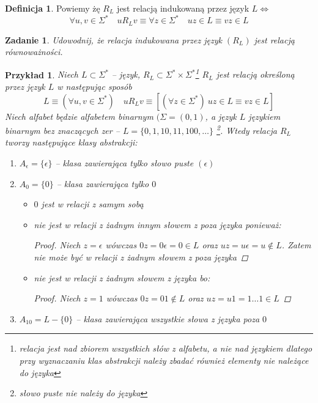 \documentclass[12pt,a4paper]{article}
\newtheorem{przyklad}{Przykład}
\newtheorem{zad}{Zadanie}
\theoremstyle{definition}
\newtheorem{df}{Definicja}
\begin{document}
	\begin{df}
		Powiemy żę $R_L$ jest relacją indukowaną przez język 
		$L \Leftrightarrow$ $$ \forall u,v \in \Sigma^* \quad uR_Lv \equiv \forall z\in \Sigma^* \quad uz\in L \equiv vz\in L$$
	\end{df}	
	
	\begin{zad} 
		Udowodnij, że relacja indukowana przez język $(R_L)$ jest relacją równoważności.
	\end{zad}
	

	\begin{przyklad}
		Niech $L \subset \Sigma^*$ -- język, $R_L \subset \Sigma^* \times \Sigma^*$\footnote{relacja jest nad zbiorem wszystkich słów z alfabetu,
		a nie nad językiem dlatego przy wyznaczaniu klas abstrakcji należy zbadać również elementy nie należące do języka}
		$R_L$ jest relacją określoną przez język $L$ w następując sposób $$L \equiv (\forall u,v \in \Sigma^*) \quad uR_Lv \equiv [(\forall z\in \Sigma^*) ~
		uz \in L \equiv vz \in L ]  $$
		Niech alfabet będzie alfabetem binarnym $(\Sigma = (0, 1)$, a język $L$ językiem binarnym bez znaczących zer -- $L = \{0, 1, 10, 11, 100, \dots \}$
		\footnote{słowo puste nie należy do języka}. Wtedy relacja $R_L$ tworzy następujące klasy abstrakcji:
		\begin{enumerate}
			\item $A_\epsilon = \{\epsilon\}$ -- klasa zawierająca tylko słowo puste $(\epsilon)$ 
			\item $A_0 = \{0\}$ -- klasa zawierająca tylko $0$
				\begin{itemize}
					\item $0$ jest w relacji z samym sobą
					\item nie jest w relacji z żadnym innym słowem z poza języka ponieważ:
					\begin{proof}
						Niech $z = \epsilon$ wówczas $0z = 0\epsilon = 0 \in L$ oraz $uz = u\epsilon = u \not\in L$. Zatem nie może być w relacji z żadnym 
						słowem z poza języka
					\end{proof}
					\item nie jest w relacji z żadnym słowem z języka bo:
					\begin{proof}
						Niech $z = 1$ wówczas $0z = 01 \not\in L$ oraz $uz = u1 = 1\dots 1 \in L$
					\end{proof}
				\end{itemize}
			\item $A_{10} = L - \{0\}$ -- klasa zawierająca wszystkie słowa z języka poza $0$

\end{enumerate}
\end{przyklad}
\end{document}
